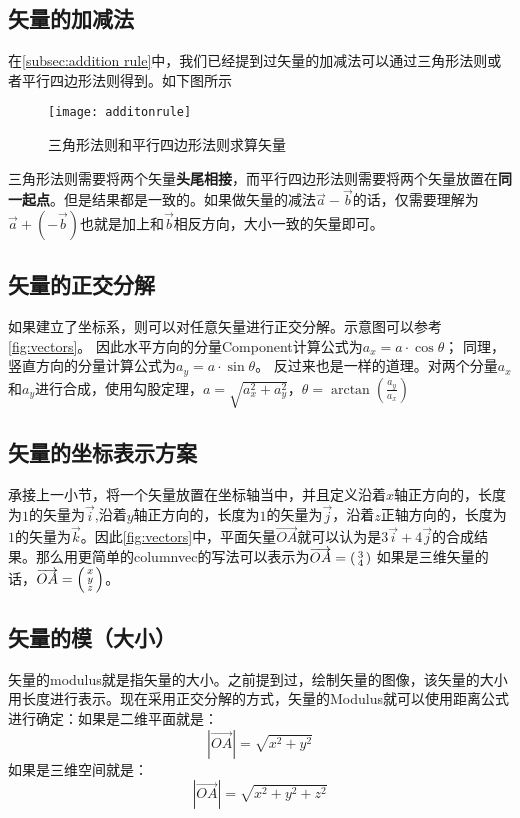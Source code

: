 \subsection*{矢量的加减法}
在\ref{subsec:addition rule}中，我们已经提到过矢量的加减法可以通过三角形法则或者平行四边形法则得到。如下图所示
\begin{figure}[H]
\centering
\texttt{[image: additonrule]}
\caption{三角形法则和平行四边形法则求算矢量}
\end{figure}

三角形法则需要将两个矢量\textbf{头尾相接}，而平行四边形法则需要将两个矢量放置在\textbf{同一起点}。但是结果都是一致的。如果做矢量的减法$\vec{a}-\vec{b}$的话，仅需要理解为$\vec{a}+(-\vec{b})$也就是加上和$\vec{b}$相反方向，大小一致的矢量即可。

\subsection*{矢量的正交分解}
\label{subsec:Decomposition of Vectors}
如果建立了坐标系，则可以对任意矢量进行正交分解。示意图可以参考\ref{fig:vectors}。
因此水平方向的分量Component计算公式为$a_x=a\cdot \cos\theta$；
同理，竖直方向的分量计算公式为$a_y=a\cdot \sin \theta$。
反过来也是一样的道理。对两个分量$a_x$和$a_y$进行合成，使用勾股定理，$a=\sqrt{a_x^2+a_y^2}$，$\theta=\arctan ( \frac{a_y}{a_x})$

\subsection*{矢量的坐标表示方案}
承接上一小节，将一个矢量放置在坐标轴当中，并且定义沿着$x$轴正方向的，长度为$1$的矢量为$\vec{i}$,沿着$y$轴正方向的，长度为$1$的矢量为$\vec{j}$，沿着$z$正轴方向的，长度为$1$的矢量为$\vec{k}$。因此\ref{fig:vectors}中，平面矢量$\overrightarrow{OA}$就可以认为是$3\vec{i}+4\vec{j}$的合成结果。那么用更简单的\gls{columnvec}的写法可以表示为$\overrightarrow{OA}=\left(\begin{smallmatrix}3\\4\end{smallmatrix}\right)$ 如果是三维矢量的话，$\overrightarrow{OA}=\left(\begin{smallmatrix}x\\y\\z\end{smallmatrix}\right)$。

\subsection*{矢量的模（大小）}
\label{subsec:Modulus}
矢量的\gls{modulus}就是指矢量的大小。之前提到过，绘制矢量的图像，该矢量的大小用长度进行表示。现在采用正交分解的方式，矢量的Modulus就可以使用距离公式进行确定：如果是二维平面就是：
\[
	|\overrightarrow{OA}| = \sqrt{x^2+y^2}
\]
如果是三维空间就是：
\[
	|\overrightarrow{OA}| = \sqrt{x^2+y^2+z^2}
\]



